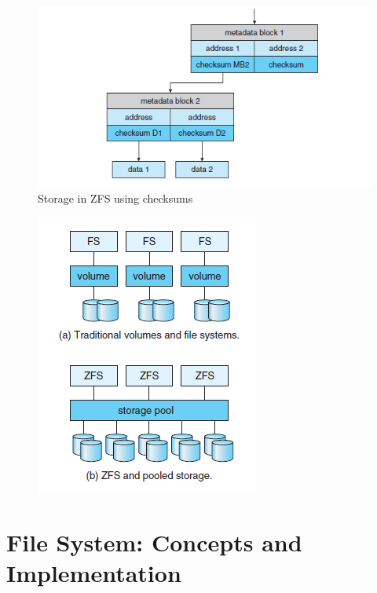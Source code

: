 \documentclass{article}
\theoremstyle{plain}
\theoremstyle{definition}
\begin{document}
\begin{figure}[!h]
    \centering
    \includegraphics[scale=0.66]{os2.png}
    \caption{Storage in ZFS using checksums}
    \label{fig:my_label_14}
\end{figure}

\begin{figure}[!ht]
    \centering
    \includegraphics[scale=0.7]{os3.png}
    \label{fig:my_label_15}
\end{figure}

\section{File System: Concepts and Implementation}
\end{document}
